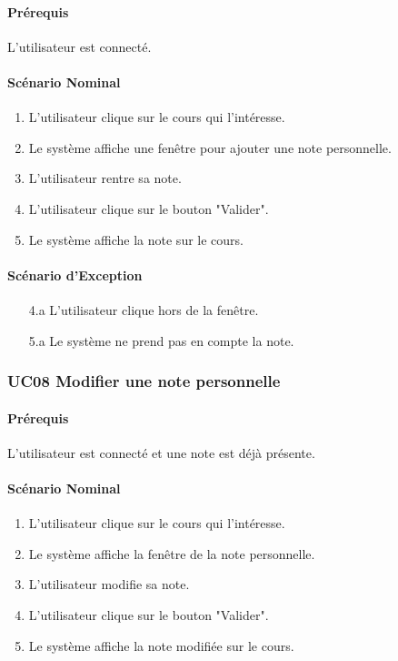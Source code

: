 \documentclass[a4paper,12pt]{article}
\begin{document}
\paragraph{Prérequis} L'utilisateur est connecté.

\paragraph{Scénario Nominal}
\begin{enumerate}
    \item L'utilisateur clique sur le cours qui l'intéresse.
    \item Le système affiche une fenêtre pour ajouter une note personnelle.
    \item L'utilisateur rentre sa note.
    \item L'utilisateur clique sur le bouton "Valider".
    \item Le système affiche la note sur le cours.
\end{enumerate}

\paragraph{Scénario d'Exception}
\begin{enumerate}
    \item[4.a] L'utilisateur clique hors de la fenêtre.
    \item[5.a] Le système ne prend pas en compte la note.
\end{enumerate}

\subsubsection{UC08 Modifier une note personnelle}
\paragraph{Prérequis} L'utilisateur est connecté et une note est déjà présente.

\paragraph{Scénario Nominal}
\begin{enumerate}
    \item L'utilisateur clique sur le cours qui l'intéresse.
    \item Le système affiche la fenêtre de la note personnelle.
    \item L'utilisateur modifie sa note.
    \item L'utilisateur clique sur le bouton "Valider".
    \item Le système affiche la note modifiée sur le cours.
\end{enumerate}
\end{document}
